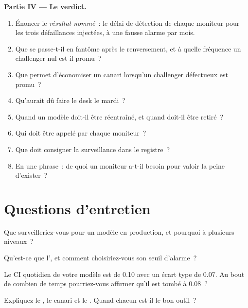\begin{problem}
\medskip\noindent\textbf{Partie IV --- Le verdict.}
\begin{enumerate}[resume]
\item Énoncer le \emph{résultat nommé}~: le délai de détection de chaque moniteur pour les trois défaillances injectées, à une fausse alarme par mois.
\item Que se passe-t-il en fantôme après le renversement, et à quelle fréquence un challenger nul est-il promu~?
\item Que permet d'économiser un canari lorsqu'un challenger défectueux est promu~?
\item Qu'aurait dû faire le desk le mardi~?
\item Quand un modèle doit-il être réentraîné, et quand doit-il être retiré~?
\item Qui doit être appelé par chaque moniteur~?
\item Que doit consigner la surveillance dans le registre~?
\item En une phrase~: de quoi un moniteur a-t-il besoin pour valoir la peine d'exister~?
\end{enumerate}
\end{problem}

\section{Questions d'entretien}

\begin{interviewq}\label{iq:ml:monitoring-and-retraining:1}
Que surveilleriez-vous pour un modèle en production, et pourquoi à plusieurs niveaux~?
\end{interviewq}

\begin{interviewq}\label{iq:ml:monitoring-and-retraining:2}
Qu'est-ce que l', et comment choisiriez-vous son seuil d'alarme~?
\end{interviewq}

\begin{interviewq}\label{iq:ml:monitoring-and-retraining:3}
Le CI quotidien de votre modèle est de 0.10 avec un écart type de 0.07. Au bout de combien de temps pourriez-vous affirmer qu'il est tombé à 0.08~?
\end{interviewq}

\begin{interviewq}\label{iq:ml:monitoring-and-retraining:4}
Expliquez le , le canari et le . Quand chacun est-il le bon outil~?
\end{interviewq}

